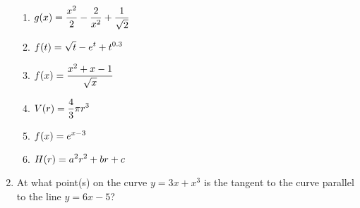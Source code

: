 \documentclass[11pt,fleqn]{article}
\begin{document}
\begin{enumerate}
\begin{enumerate}
\item  $\displaystyle g(x)=\frac{x^2}{2}-\frac{2}{x^2}+\frac{1}{\sqrt{2}}$
\vfill

\newpage
\item  $\displaystyle f(t)=\sqrt{t}-e^t+t^{0.3}$
\vfill

\item  $\displaystyle f(x)=\frac{x^2 + x -1}{\sqrt{x}}$
\vfill

\item $\displaystyle V(r)=\frac{4}{3}\pi r^3$
\vfill

\item  $\displaystyle f(x)= e^{x-3}$
\vfill

\item $\displaystyle H(r) = a^2r^2+br+c$
\vfill
\end{enumerate}
\item At what point(s) on the curve $y=3x+x^3$ is the tangent to the curve parallel to the line $y=6x-5$?
\vfill

\vfill
\end{enumerate}
\end{document}
